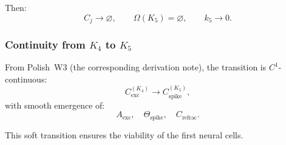 Then:
\[
  C_j \to \varnothing,
\qquad
  \Omega(K_5)=\varnothing,
\qquad
  k_5\to 0.
\]

\subsubsection{Continuity from \texorpdfstring{$K_4$}{K_4} to \texorpdfstring{$K_5$}{K_5}}

From Polish~W3 (the corresponding derivation note), the transition is $C^1$-continuous:
\[
  C_{\mathrm{exc}}^{(K_4)}
   \longrightarrow
  C_{\mathrm{spike}}^{(K_5)},
\]
with smooth emergence of:
\[
  A_{\mathrm{exc}},\quad
  \Theta_{\mathrm{spike}},\quad
  C_{\mathrm{refrac}}.
\]

This soft transition ensures the viability of the first neural cells.
